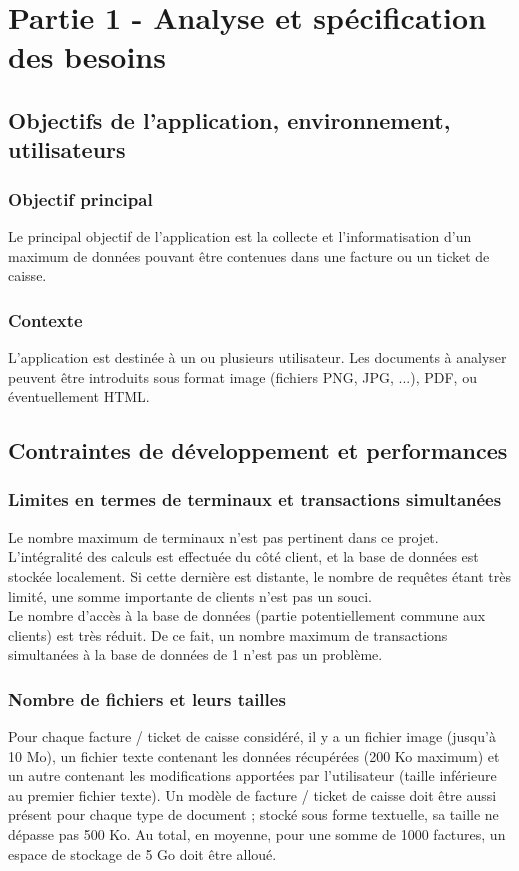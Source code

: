 \chapter{Partie 1 - Analyse et spécification des besoins}

\section{Objectifs de l'application, environnement, utilisateurs}

\subsection{Objectif principal}
Le principal objectif de l'application est la collecte et l'informatisation d'un maximum de données pouvant être contenues dans une facture ou un ticket de caisse.  

\subsection{Contexte}
L'application est destinée à un ou plusieurs utilisateur. Les documents à analyser peuvent être introduits sous format image (fichiers PNG, JPG, ...), PDF, ou éventuellement HTML.

\section{Contraintes de développement et performances}

\subsection{Limites en termes de terminaux et transactions simultanées}
Le nombre maximum de terminaux n’est pas pertinent dans ce projet. L’intégralité des calculs est effectuée du côté client, et la base de données est stockée localement. Si cette dernière est distante, le nombre de requêtes étant très limité, une somme importante de clients n’est pas un souci.\\

Le nombre d’accès à la base de données (partie potentiellement commune aux clients) est très réduit. De ce fait, un nombre maximum de transactions simultanées à la base de données de 1 n’est pas un problème.

\subsection{Nombre de fichiers et leurs tailles}
Pour chaque facture / ticket de caisse considéré, il y a un fichier image (jusqu’à 10 Mo), un fichier texte contenant les données récupérées (200 Ko maximum) et un autre contenant les modifications apportées par l'utilisateur (taille inférieure au premier fichier texte). Un modèle de facture / ticket de caisse doit être aussi présent pour chaque type de document ; stocké sous forme textuelle, sa taille ne dépasse pas 500 Ko.
Au total, en moyenne, pour une somme de 1000 factures, un espace de stockage de 5 Go doit être alloué.

